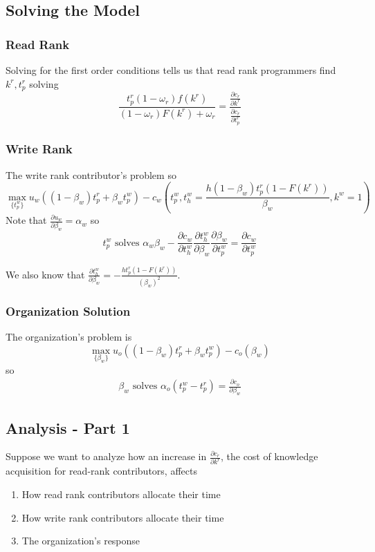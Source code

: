 \documentclass[source/paper/main.tex]{subfiles}
\begin{document}
\subsection{Solving the Model}
\subsubsection{Read Rank}
Solving for the first order conditions tells us that read rank programmers find $k^r, t_p^r$ solving 
$$\frac{t_p^r(1-\omega_r)f(k^r)}{(1-\omega_r)F(k^r) + \omega_r} = \frac{\frac{\partial c_r}{\partial k^r}}{\frac{\partial c_r}{\partial t_p^r}}$$
\subsubsection{Write Rank}
The write rank contributor's problem so
$$\max_{\{t_p^w\}} u_w\left((1-\beta_w) t_p^r + \beta_w t_p^w \right) - c_w\left(t_p^w, t_h^w = \frac{ h (1-\beta_w) t_p^r(1-F(k^r))}{\beta_w}, k^w = 1\right)$$
Note that $\frac{\partial u_w}{\partial \beta_w} = \alpha_w$ 
so $$t_p^w \text{ solves } \alpha_w \beta_w - \frac{\partial c_w}{\partial t_h^w} \frac{\partial t_h^w}{\partial \beta_w}\frac{\partial \beta_w}{\partial t_p^w} = \frac{\partial c_w}{\partial t_p^w} $$

We also know that $\frac{\partial t_h^w}{\partial \beta_w} = - \frac{h t_p^r (1-F(k^r))}{(\beta_w)^2}$.
\subsubsection{Organization Solution}
The organization's problem is 
$$\max_{\{\beta_w\}} u_o\left((1-\beta_w) t_p^r + \beta_w t_p^w\right) - c_o(\beta_w)$$ 
so 
\begin{align}
    \beta_w \text{ solves } \alpha_o(t_p^w - t_p^r) = \frac{\partial c_o}{\partial \beta_w} \label{org_solution}
\end{align}


\subsection{Analysis - Part 1}
Suppose we want to analyze how an increase in $\frac{\partial c_r}{\partial k^r}$, the cost of knowledge acquisition for read-rank contributors, affects
\begin{enumerate}
    \item How read rank contributors allocate their time
    \item How write rank contributors allocate their time
    \item The organization's response
\end{enumerate}
\end{document}
